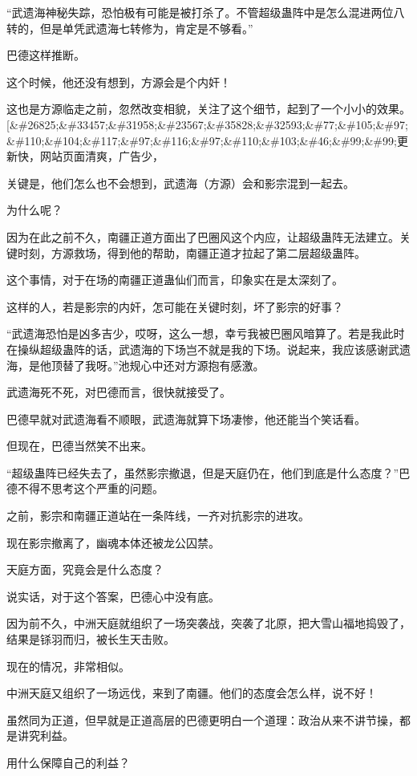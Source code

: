 \begin{this_body}
“武遗海神秘失踪，恐怕极有可能是被打杀了。不管超级蛊阵中是怎么混进两位八转的，但是单凭武遗海七转修为，肯定是不够看。”

巴德这样推断。

这个时候，他还没有想到，方源会是个内奸！

这也是方源临走之前，忽然改变相貌，关注了这个细节，起到了一个小小的效果。[\&\#26825;\&\#33457;\&\#31958;\&\#23567;\&\#35828;\&\#32593;\&\#77;\&\#105;\&\#97;\&\#110;\&\#104;\&\#117;\&\#97;\&\#116;\&\#97;\&\#110;\&\#103;\&\#46;\&\#99;\&\#99;更新快，网站页面清爽，广告少，

关键是，他们怎么也不会想到，武遗海（方源）会和影宗混到一起去。

为什么呢？

因为在此之前不久，南疆正道方面出了巴圈风这个内应，让超级蛊阵无法建立。关键时刻，方源救场，得到他的帮助，南疆正道才拉起了第二层超级蛊阵。

这个事情，对于在场的南疆正道蛊仙们而言，印象实在是太深刻了。

这样的人，若是影宗的内奸，怎可能在关键时刻，坏了影宗的好事？

“武遗海恐怕是凶多吉少，哎呀，这么一想，幸亏我被巴圈风暗算了。若是我此时在操纵超级蛊阵的话，武遗海的下场岂不就是我的下场。说起来，我应该感谢武遗海，是他顶替了我呀。”池规心中还对方源抱有感激。

武遗海死不死，对巴德而言，很快就接受了。

巴德早就对武遗海看不顺眼，武遗海就算下场凄惨，他还能当个笑话看。

但现在，巴德当然笑不出来。

“超级蛊阵已经失去了，虽然影宗撤退，但是天庭仍在，他们到底是什么态度？”巴德不得不思考这个严重的问题。

之前，影宗和南疆正道站在一条阵线，一齐对抗影宗的进攻。

现在影宗撤离了，幽魂本体还被龙公囚禁。

天庭方面，究竟会是什么态度？

说实话，对于这个答案，巴德心中没有底。

因为前不久，中洲天庭就组织了一场突袭战，突袭了北原，把大雪山福地捣毁了，结果是铩羽而归，被长生天击败。

现在的情况，非常相似。

中洲天庭又组织了一场远伐，来到了南疆。他们的态度会怎么样，说不好！

虽然同为正道，但早就是正道高层的巴德更明白一个道理：政治从来不讲节操，都是讲究利益。

用什么保障自己的利益？


\end{this_body}

